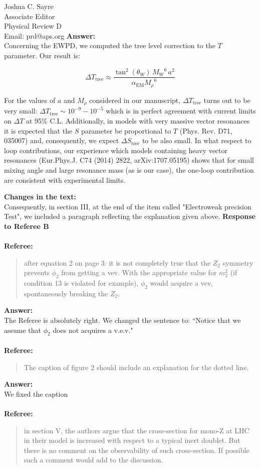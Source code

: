 \documentclass[10pt,a4paper]{letter}
\begin{document}
\begin{letter}{Joshua C. Sayre\\ 
			Associate Editor\\
			Physical Review D\\
			Email: prd@aps.org}
{\bf Answer:}\\
Concerning the EWPD, we computed the tree level correction to the $T$ parameter. Our result is:

\[
\Delta T_{\mathrm{tree}}\approx\frac{{{\tan^{2}(\theta_W)}}\, {{\mathit{M_W}}^{6}}\, {{a}^{2}}}{{\alpha_{\mathrm{EM}}{\mathit{M_{\rho} }}^{6}}}
\]

For the values of $a$ and $M_{\rho}$ considered in our manuscript, $\Delta T_{\mathrm{tree}}$ turns out to be very small: $\Delta T_{\mathrm{tree}}\sim 10^{-9}-10^{-5} $ which is in perfect agreement with current limits on  $\Delta T$ at 95\% C.L. Additionally, in models with very massive vector resonances it is expected that the $S$ parameter be proportional to $T$ (Phys. Rev. D71, 035007) and, consequently, we expect $\Delta S_{\mathrm{tree}}$ to be also small. In what respect to loop contributions, our experience which models containing heavy vector resonances (Eur.Phys.J. C74 (2014) 2822,  arXiv:1707.05195) shows that for small mixing angle and large resonance mass (as is our case), the one-loop contribution are consistent with experimental limits.

{\bf Changes in the text:}\\
Consequently, in section III, at the end of the item called "Electroweak precision Test", we included a paragraph reflecting the explanation given above.
\newpage
{\bf Response to Referee B}
\\
\\
	{\bf Referee:}
\begin{quotation}
	after equation 2 on page 3: it is not completely true that the $Z_2$
	symmetry prevents $\phi_2$ from getting a vev. With the appropriate value
	for $m_2^2$ (if condition 13 is violated for example), $\phi_2$ would
	acquire a vev, spontaneously breaking the $Z_2$.
\end{quotation}	

{\bf Answer:}\\
The Referee is absolutely right. We changed the sentence to: ``Notice that we assume that $\phi_{2}$ does not acquires a v.e.v."
\\
\\
	{\bf Referee:}
\begin{quotation}
	The caption of figure 2 should include an explanation for the dotted
	line.
\end{quotation}	

{\bf Answer:}\\
We fixed the caption
\\
\\
{\bf Referee:}
\begin{quotation}
	in section V, the authors argue that the cross-section for mono-Z at
	LHC in their model is increased with respect to a typical inert
	doublet. But there is no comment on the observability of such
	cross-section. If possible such a comment would add to the discussion.
\end{quotation}


\end{letter}
\end{document}

